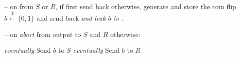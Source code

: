 \begin{minipage}{0.5\textwidth}
\begin{bbox}[title={Functionality $\F_\m{flip}(S,R)$}]
~
\begin{itemize}[leftmargin=*]
\item[--] on  from $S$ or $R$, if first  send back  otherwise, generate and store the coin flip $b \xleftarrow{\$} \{0,1\}$ and send back  \emph{and leak $b$ to \A}.
\item[--] on \emph{abort} from \A output  to $S$ and $R$ otherwise:
\begin{itemize}
\citem \emph{eventually} Send $b$ to $S$
\citem \emph{eventually} Send $b$ to $R$
\end{itemize}
\end{itemize}
\end{bbox}
\end{minipage}
